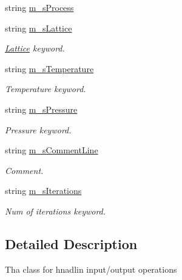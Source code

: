 \begin{DoxyCompactItemize}
string \mbox{\hyperlink{classIO_a7685f7b9fcdf945b14bb3ca100e0cf49}{m\+\_\+s\+Process}}
\item 
\mbox{\label{classIO_a498cce7187c540e12d8dc8e34dcfc30b}} 
string \mbox{\hyperlink{classIO_a498cce7187c540e12d8dc8e34dcfc30b}{m\+\_\+s\+Lattice}}
\begin{DoxyCompactList}\small\item\em \mbox{\hyperlink{classLattice}{Lattice}} keyword. \end{DoxyCompactList}\item 
\mbox{\label{classIO_a540874a497024a017f3a5f3a44fe4a3f}} 
string \mbox{\hyperlink{classIO_a540874a497024a017f3a5f3a44fe4a3f}{m\+\_\+s\+Temperature}}
\begin{DoxyCompactList}\small\item\em Temperature keyword. \end{DoxyCompactList}\item 
\mbox{\label{classIO_ac8c1b50fbc99cea5c3405e7903b7d8f1}} 
string \mbox{\hyperlink{classIO_ac8c1b50fbc99cea5c3405e7903b7d8f1}{m\+\_\+s\+Pressure}}
\begin{DoxyCompactList}\small\item\em Pressure keyword. \end{DoxyCompactList}\item 
\mbox{\label{classIO_a45c04a8fa3c6ea567fee51693c3e52d5}} 
string \mbox{\hyperlink{classIO_a45c04a8fa3c6ea567fee51693c3e52d5}{m\+\_\+s\+Comment\+Line}}
\begin{DoxyCompactList}\small\item\em Comment. \end{DoxyCompactList}\item 
\mbox{\label{classIO_aaa76fd794e1fe15797501ef4da832672}} 
string \mbox{\hyperlink{classIO_aaa76fd794e1fe15797501ef4da832672}{m\+\_\+s\+Iterations}}
\begin{DoxyCompactList}\small\item\em Num of iterations keyword. \end{DoxyCompactList}\end{DoxyCompactItemize}


\subsection{Detailed Description}
Tha class for hnadlin input/output operations 

